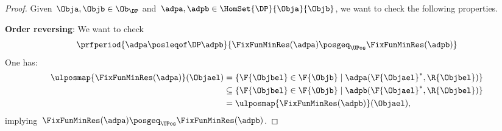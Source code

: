 \begin{proof}
	Given~$\Obja,\Objb \in \Ob_\DP$ and~$\adpa,\adpb \in \HomSet{\DP}{\Obja}{\Objb}$, we want to check the following properties.

	\textbf{Order reversing}:
	We want to check
	\begin{equation*}
		\prfperiod{\adpa \posleqof\DP \adpb}{\FixFunMinRes(\adpa) \posgeq_\UPos \FixFunMinRes(\adpb)}
	\end{equation*}
	One has:
	\begin{equation*}
		\begin{aligned}
			\ulposmap{\FixFunMinRes(\adpa)}(\Objael) & =\{\F{\Objbel} \in \F{\Objb} \mid \adpa(\F{\Objael}^*, \R{\Objbel})\}          \\
			                                         & \subseteq \{\F{\Objbel} \in \F{\Objb} \mid \adpb(\F{\Objael}^*, \R{\Objbel})\} \\
			                                         & = \ulposmap{\FixFunMinRes(\adpb)}(\Objael),
		\end{aligned}
	\end{equation*}
	implying~$\FixFunMinRes(\adpa) \posgeq_\UPos \FixFunMinRes(\adpb)$.


\end{proof}
